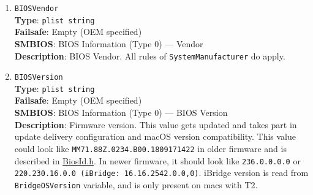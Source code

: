 \documentclass[]{article}
\begin{document}
\begin{enumerate}
\item
  \texttt{BIOSVendor}\\
  \textbf{Type}: \texttt{plist\ string}\\
  \textbf{Failsafe}: Empty (OEM specified)\\
  \textbf{SMBIOS}: BIOS Information (Type 0) --- Vendor\\
  \textbf{Description}: BIOS Vendor. All rules of
  \texttt{SystemManufacturer} do apply.
\item
  \texttt{BIOSVersion}\\
  \textbf{Type}: \texttt{plist\ string}\\
  \textbf{Failsafe}: Empty (OEM specified)\\
  \textbf{SMBIOS}: BIOS Information (Type 0) --- BIOS Version\\
  \textbf{Description}: Firmware version. This value gets updated and
  takes part in update delivery configuration and macOS version
  compatibility. This value could look like
  \texttt{MM71.88Z.0234.B00.1809171422} in older firmware and is
  described in
  \href{https://github.com/acidanthera/OpenCorePkg/blob/master/Include/Apple/Guid/BiosId.h}{BiosId.h}.
  In newer firmware, it should look like \texttt{236.0.0.0.0} or
  \texttt{220.230.16.0.0\ (iBridge:\ 16.16.2542.0.0,0)}. iBridge version
  is read from \texttt{BridgeOSVersion} variable, and is only present on
  macs with T2.


\end{enumerate}
\end{document}
